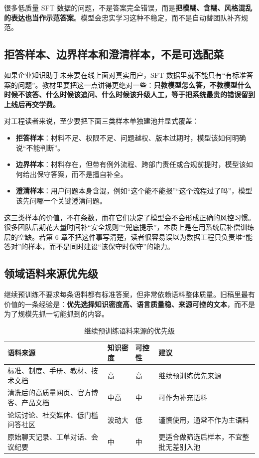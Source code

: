 很多低质量 SFT 数据的问题，不是答案完全错误，而是\textbf{把模糊、含糊、风格混乱的表达也当作示范答案}。模型会忠实学习这种不稳定，而不是自动替团队补齐规范。

\subsection{拒答样本、边界样本和澄清样本，不是可选配菜}
如果企业知识助手未来要在线上面对真实用户，SFT 数据里就不能只有“有标准答案的问题”。教材里要把这一点讲得更绝对一些：\textbf{只教模型怎么答，不教模型什么时候不该答、什么时候该追问、什么时候该升级人工，等于把系统最贵的错误留到上线后再交学费。}

对工程读者来说，至少要把下面三类样本单独建池并显式覆盖：
\begin{itemize}
  \item \textbf{拒答样本}：材料不足、权限不足、问题越权、版本过期时，模型该如何明确说“不能判断”。
  \item \textbf{边界样本}：材料存在，但带有例外流程、跨部门责任或合规前提时，模型该如何给出保守答案，而不是擅自补全。
  \item \textbf{澄清样本}：用户问题本身含混，例如“这个能不能报”“这个流程过了吗”，模型该先问哪一个关键澄清问题。
\end{itemize}

这三类样本的价值，不在条数，而在它们决定了模型会不会形成正确的风控习惯。很多团队后期花大量时间补“安全规则”“兜底提示”，本质上是在用系统层补偿训练层的空缺。若第 6 章不把这件事写清楚，读者很容易误以为数据工程只负责堆“能答对”的样本，而不是同时建设“该保守时保守”的能力。

\subsection{领域语料来源优先级}
继续预训练不要求每条语料都有标准答案，但非常依赖语料整体质量。旧稿里最有价值的一条经验是：\textbf{优先选择知识密度高、语言质量稳、来源可控的文本}，而不是为了规模先抓一切能抓到的内容。

\begin{table}[H]
\centering
\small
\begin{tabularx}{\textwidth}{>{\raggedright\arraybackslash}p{3cm}>{\raggedright\arraybackslash}p{2.2cm}>{\raggedright\arraybackslash}p{2.2cm}>{\raggedright\arraybackslash}X}
\toprule
\textbf{语料来源} & \textbf{知识密度} & \textbf{可控性} & \textbf{建议} \\
\midrule
标准、制度、手册、教材、技术文档 & 高 & 高 & 继续预训练优先来源 \\
清洗后的高质量网页、官方博客、产品文档 & 中高 & 中 & 可作为补充语料 \\
论坛讨论、社交媒体、低门槛问答社区 & 波动大 & 低 & 谨慎使用，通常不作为主语料 \\
原始聊天记录、工单对话、会议纪要 & 中 & 中 & 更适合做筛选后样本，不宜整批无差别入池 \\
\bottomrule
\end{tabularx}
\caption{继续预训练语料来源的优先级}
\label{tab:cpt-source-priority}
\end{table}

